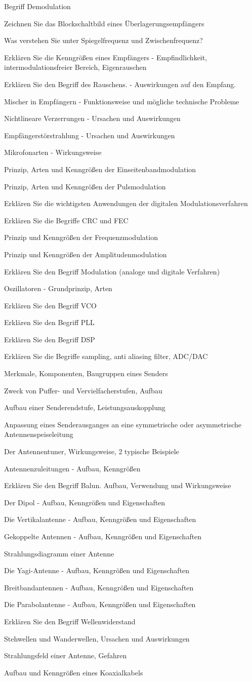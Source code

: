\documentclass[avery5371,grid,frame,a4paper]{flashcards}
\newcommand\question[2]{
  \begin{flashcard}[{\chap} -- #1]{#2}\end{flashcard}
}
\begin{document}
\question{36}{Begriff Demodulation}
\question{37}{Zeichnen Sie das Blockschaltbild eines Überlagerungsempfängers}
\question{38}{Was verstehen Sie unter Spiegelfrequenz und Zwischenfrequenz?}
\question{39}{Erklären Sie die Kenngrößen eines Empfängers - Empfindlichkeit, intermodulationsfreier Bereich, Eigenrauschen}
\question{40}{Erklären Sie den Begriff des Rauschens. - Auswirkungen auf den Empfang.}
\question{41}{Mischer in Empfängern - Funktionsweise und mögliche technische Probleme}
\question{42}{Nichtlineare Verzerrungen - Ursachen und Auswirkungen}
\question{43}{Empfängerstörstrahlung - Ursachen und Auswirkungen}
\question{44}{Mikrofonarten - Wirkungsweise}
\question{45}{Prinzip, Arten und Kenngrößen der Einseitenbandmodulation}
\question{46}{Prinzip, Arten und Kenngrößen der Pulsmodulation}
\question{47}{Erklären Sie die wichtigsten Anwendungen der digitalen Modulationsverfahren}
\question{48}{Erklären Sie die Begriffe CRC und FEC}
\question{49}{Prinzip und Kenngrößen der Frequenzmodulation}
\question{50}{Prinzip und Kenngrößen der Amplitudenmodulation}
\question{51}{Erklären Sie den Begriff Modulation (analoge und digitale Verfahren)}
\question{52}{Oszillatoren - Grundprinzip, Arten}
\question{53}{Erklären Sie den Begriff VCO}
\question{54}{Erklären Sie den Begriff PLL}
\question{55}{Erklären Sie den Begriff DSP}
\question{56}{Erklären Sie die Begriffe sampling, anti aliasing filter, ADC/DAC}
\question{57}{Merkmale, Komponenten, Baugruppen eines Senders}
\question{58}{Zweck von Puffer- und Vervielfacherstufen, Aufbau}
\question{59}{Aufbau einer Senderendstufe, Leistungsauskopplung}
\question{60}{Anpassung eines Senderausganges an eine symmetrische oder asymmetrische Antennenspeiseleitung}
\question{61}{Der Antennentuner, Wirkungsweise, 2 typische Beispiele}
\question{62}{Antennenzuleitungen - Aufbau, Kenngrößen}
\question{63}{Erklären Sie den Begriff Balun. Aufbau, Verwendung und Wirkungsweise}
\question{64}{Der Dipol - Aufbau, Kenngrößen und Eigenschaften}
\question{65}{Die Vertikalantenne - Aufbau, Kenngrößen und Eigenschaften}
\question{66}{Gekoppelte Antennen - Aufbau, Kenngrößen und Eigenschaften}
\question{67}{Strahlungsdiagramm einer Antenne}
\question{68}{Die Yagi-Antenne - Aufbau, Kenngrößen und Eigenschaften}
\question{69}{Breitbandantennen - Aufbau, Kenngrößen und Eigenschaften}
\question{70}{Die Parabolantenne - Aufbau, Kenngrößen und Eigenschaften}
\question{71}{Erklären Sie den Begriff Wellenwiderstand}
\question{72}{Stehwellen und Wanderwellen, Ursachen und Auswirkungen}
\question{73}{Strahlungsfeld einer Antenne, Gefahren}
\question{74}{Aufbau und Kenngrößen eines Koaxialkabels}
\end{document}
